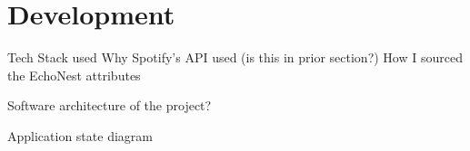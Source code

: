 \chapter{Development}
Tech Stack used
Why Spotify's API used (is this in prior section?)
How I sourced the EchoNest attributes

Software architecture of the project?

Application state diagram